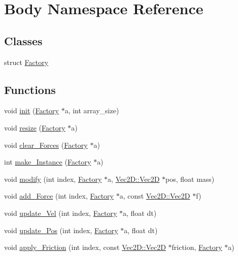 \hypertarget{namespace_body}{}\section{Body Namespace Reference}
\label{namespace_body}
\subsection*{Classes}
\begin{DoxyCompactItemize}
\item 
struct \mbox{\hyperlink{struct_body_1_1_factory}{Factory}}
\end{DoxyCompactItemize}
\subsection*{Functions}
\begin{DoxyCompactItemize}
\item 
void \mbox{\hyperlink{namespace_body_a2d62ef72580eb5883ebaee936b1105c7}{init}} (\mbox{\hyperlink{struct_body_1_1_factory}{Factory}} $\ast$a, int array\+\_\+size)
\item 
void \mbox{\hyperlink{namespace_body_ade37e2bc965edf7226ec2876383eb266}{resize}} (\mbox{\hyperlink{struct_body_1_1_factory}{Factory}} $\ast$a)
\item 
void \mbox{\hyperlink{namespace_body_a58172e4bc16d9c5117b5625f6918132c}{clear\+\_\+\+Forces}} (\mbox{\hyperlink{struct_body_1_1_factory}{Factory}} $\ast$a)
\item 
int \mbox{\hyperlink{namespace_body_aa1f1401ef15a1eed126c67a080b2506c}{make\+\_\+\+Instance}} (\mbox{\hyperlink{struct_body_1_1_factory}{Factory}} $\ast$a)
\item 
void \mbox{\hyperlink{namespace_body_ad033221a98d2de393b77352eddf1a7bb}{modify}} (int index, \mbox{\hyperlink{struct_body_1_1_factory}{Factory}} $\ast$a, \mbox{\hyperlink{struct_vec2_d_1_1_vec2_d}{Vec2\+D\+::\+Vec2D}} $\ast$pos, float mass)
\item 
void \mbox{\hyperlink{namespace_body_af3ba929a43f9efd909bb113b39740a84}{add\+\_\+\+Force}} (int index, \mbox{\hyperlink{struct_body_1_1_factory}{Factory}} $\ast$a, const \mbox{\hyperlink{struct_vec2_d_1_1_vec2_d}{Vec2\+D\+::\+Vec2D}} $\ast$f)
\item 
void \mbox{\hyperlink{namespace_body_a93be1c44dee756c2e3f94603f526bed2}{update\+\_\+\+Vel}} (int index, \mbox{\hyperlink{struct_body_1_1_factory}{Factory}} $\ast$a, float dt)
\item 
void \mbox{\hyperlink{namespace_body_a021a17c895acfea05e10a1fdb2c20b51}{update\+\_\+\+Pos}} (int index, \mbox{\hyperlink{struct_body_1_1_factory}{Factory}} $\ast$a, float dt)
\item 
void \mbox{\hyperlink{namespace_body_aad381674a5614ab2d8801dd3d9d718ea}{apply\+\_\+\+Friction}} (int index, const \mbox{\hyperlink{struct_vec2_d_1_1_vec2_d}{Vec2\+D\+::\+Vec2D}} $\ast$friction, \mbox{\hyperlink{struct_body_1_1_factory}{Factory}} $\ast$a)
\end{DoxyCompactItemize}


